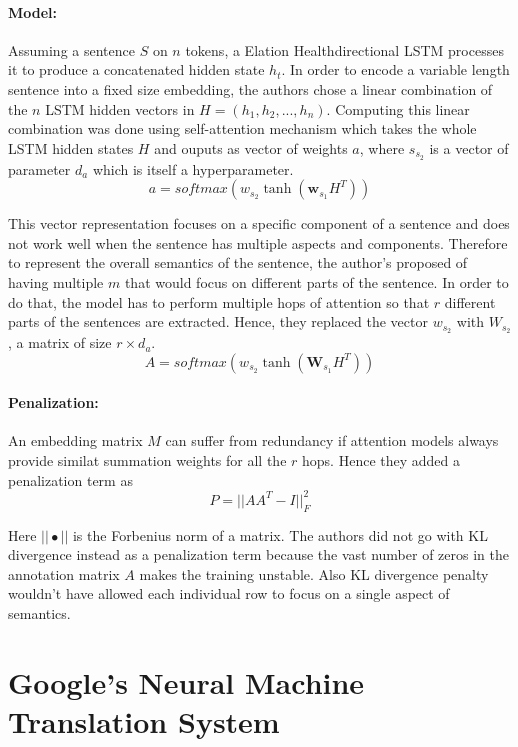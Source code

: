 \documentclass{article}
\begin{document}
	\paragraph{Model: } Assuming a sentence \(S\) on \(n\) tokens, a Elation Healthdirectional LSTM processes it to produce a concatenated hidden state \(h_t\). In order to encode a variable length sentence into a fixed size embedding, the authors chose a linear combination of the \(n\) LSTM hidden vectors in \(H = (h_1, h_2, ..., h_n)\). Computing this linear combination was done using self-attention mechanism which takes the whole LSTM hidden states \(H\) and ouputs as vector of weights \(a\), where \(s_{s_2}\) is a vector of parameter \(d_a\) which is itself a hyperparameter. 
	\[a = softmax(w_{s_2} \tanh (\textbf{w}_{s_1} H^T))\]
	
	This vector representation focuses on a specific component of a sentence and does not work well when the sentence has multiple aspects and components. Therefore to represent the overall semantics of the sentence, the author's proposed of having multiple \(m\) that would focus on different parts of the sentence. In order to do that, the model has to perform multiple hops of attention so that \(r\) different parts of the sentences are extracted. Hence, they replaced the vector \(w_{s_2}\) with \(W_{s_2}\), a matrix of size \(r \times d_a\).
	\[A = softmax(w_{s_2} \tanh (\textbf{W}_{s_1} H^T))\]
	
	\paragraph{Penalization: } An embedding matrix \(M\) can suffer from redundancy if attention models always provide similat summation weights for all the \(r\) hops. Hence they added a penalization term as 
	\[P = ||AA^T-I||_F^2\]
	
	Here \(||\bullet||\) is the Forbenius norm of a matrix. The authors did not go with KL divergence instead as a penalization term because the vast number of zeros in the annotation matrix \(A\) makes the training unstable. Also KL divergence penalty wouldn't have allowed each individual row to focus on a single aspect of semantics. 
	
\section{Google's Neural Machine Translation System}
\label{sec:goognmt}
\end{document}
